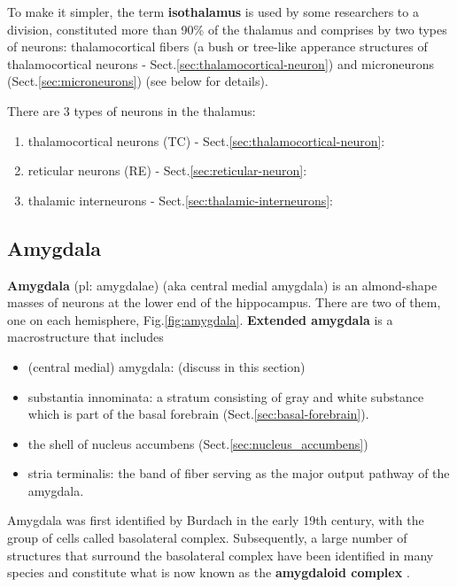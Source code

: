 To make it simpler, the term {\bf isothalamus} is used by some researchers to a
division, constituted more than 90\% of the thalamus and comprises by two types
of neurons: thalamocortical fibers (a bush or tree-like apperance structures of
thalamocortical neurons - Sect.\ref{sec:thalamocortical-neuron}) and
microneurons (Sect.\ref{sec:microneurons}) (see below for details).

There are 3 types of neurons in the thalamus:
\begin{enumerate}
  \item thalamocortical neurons (TC) - Sect.\ref{sec:thalamocortical-neuron}:
  
  \item reticular neurons (RE) - Sect.\ref{sec:reticular-neuron}:  
  
  \item thalamic interneurons - Sect.\ref{sec:thalamic-interneurons}:
\end{enumerate}




\subsection{Amygdala}
\label{sec:amygdala}

{\bf Amygdala} (pl: amygdalae) (aka central medial amygdala) is an almond-shape
masses of neurons at the lower end of the hippocampus. There are two of them,
one on each hemisphere, Fig.\ref{fig:amygdala}.
{\bf Extended amygdala} is a macrostructure that includes
\begin{itemize}
  \item (central medial) amygdala: (discuss in this section)
  
  \item substantia innominata: a stratum consisting of gray and white substance
  which is part of the basal forebrain (Sect.\ref{sec:basal-forebrain}).
  
  \item the shell of nucleus accumbens (Sect.\ref{sec:nucleus_accumbens})
  
  \item stria terminalis: the band of fiber serving as the major output pathway
  of the amygdala.
\end{itemize}


Amygdala was first identified by Burdach in the early 19th century, with the
group of cells called basolateral complex.
Subsequently, a large number of structures that surround the basolateral complex
have been identified in many species and constitute what is now known as the
{\bf amygdaloid complex} \citep{sah2003amygdala}. 

